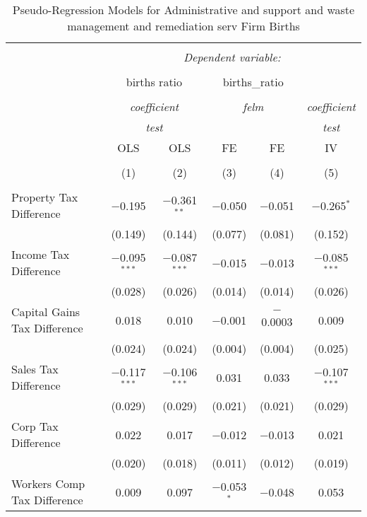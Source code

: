 
\begin{table}[!htbp] \centering 
  \caption{Pseudo-Regression Models for  Administrative and support and waste management and remediation serv Firm Births} 
  \label{} 
\begin{tabular}{@{\extracolsep{5pt}}lccccc} 
\\[-1.8ex]\hline 
\hline \\[-1.8ex] 
 & \multicolumn{5}{c}{\textit{Dependent variable:}} \\ 
\cline{2-6} 
\\[-1.8ex] & \multicolumn{2}{c}{births ratio} & \multicolumn{2}{c}{births\_ratio} &   \\ 
\\[-1.8ex] & \multicolumn{2}{c}{\textit{coefficient}} & \multicolumn{2}{c}{\textit{felm}} & \textit{coefficient} \\ 
 & \multicolumn{2}{c}{\textit{test}} & \multicolumn{2}{c}{\textit{}} & \textit{test} \\ 
 & OLS & OLS & FE & FE & IV \\ 
\\[-1.8ex] & (1) & (2) & (3) & (4) & (5)\\ 
\hline \\[-1.8ex] 
 Property Tax Difference & $-$0.195 & $-$0.361$^{**}$ & $-$0.050 & $-$0.051 & $-$0.265$^{*}$ \\ 
  & (0.149) & (0.144) & (0.077) & (0.081) & (0.152) \\ 
  Income Tax Difference & $-$0.095$^{***}$ & $-$0.087$^{***}$ & $-$0.015 & $-$0.013 & $-$0.085$^{***}$ \\ 
  & (0.028) & (0.026) & (0.014) & (0.014) & (0.026) \\ 
  Capital Gains Tax Difference & 0.018 & 0.010 & $-$0.001 & $-$0.0003 & 0.009 \\ 
  & (0.024) & (0.024) & (0.004) & (0.004) & (0.025) \\ 
  Sales Tax Difference & $-$0.117$^{***}$ & $-$0.106$^{***}$ & 0.031 & 0.033 & $-$0.107$^{***}$ \\ 
  & (0.029) & (0.029) & (0.021) & (0.021) & (0.029) \\ 
  Corp Tax Difference & 0.022 & 0.017 & $-$0.012 & $-$0.013 & 0.021 \\ 
  & (0.020) & (0.018) & (0.011) & (0.012) & (0.019) \\ 
  Workers Comp Tax Difference & 0.009 & 0.097 & $-$0.053$^{*}$ & $-$0.048 & 0.053 \\ 

\end{tabular}
\end{table}
